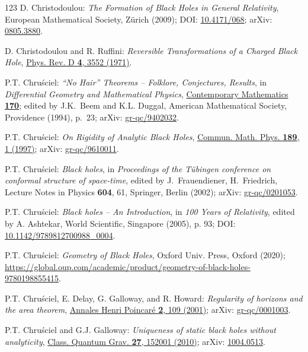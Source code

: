 \begin{thebibliography}{123}
D. Christodoulou:
{\em The Formation of Black Holes in General Relativity},
European Mathematical Society, Zürich (2009);
DOI: \href{https://doi.org/10.4171/068}{10.4171/068};
arXiv: \href{https://arxiv.org/abs/0805.3880}{0805.3880}.

D. Christodoulou and R. Ruffini:
{\em Reversible Transformations of a Charged Black Hole},
\href{https://doi.org/10.1103/PhysRevD.4.3552}{Phys. Rev. D {\bf 4}, 3552 (1971)}.

P.T. Chru\'sciel:
{\em ``No Hair'' Theorems -- Folklore, Conjectures, Results},
in {\em Differential Geometry and Mathematical Physics},
\href{https://doi.org/10.1090/conm/170}{Contemporary Mathematics {\bf 170}};
edited by  J.K.~Beem and K.L. Duggal,
American Mathematical Society, Providence (1994), p.~23;
arXiv: \href{https://arxiv.org/abs/gr-qc/9402032}{gr-qc/9402032}.

P.T. Chru\'sciel: {\em On Rigidity of Analytic Black Holes},
\href{https://doi.org/10.1007/s002200050187}{Commun. Math. Phys. {\bf 189}, 1 (1997)};
arXiv: \href{https://arxiv.org/abs/gr-qc/9610011}{gr-qc/9610011}.

P.T. Chru\'sciel: {\em Black holes},
in {\em Proceedings of the T\"ubingen conference on conformal structure of
space-time}, edited by J.~Frauendiener, H.~Friedrich,
Lecture Notes in Physics {\bf 604}, 61,
Springer, Berlin (2002);
arXiv: \href{https://arxiv.org/abs/gr-qc/0201053}{gr-qc/0201053}.

P.T. Chru\'sciel: {\em Black holes -- An Introduction},
in {\em 100 Years of Relativity}, edited by A. Ashtekar,
World Scientific, Singapore (2005), p. 93;
DOI: \href{https://doi.org/10.1142/9789812700988_0004}{10.1142/9789812700988\_0004}.

P.T. Chru\'sciel: {\em Geometry of Black Holes},
Oxford Univ. Press, Oxford (2020);
{\footnotesize \url{https://global.oup.com/academic/product/geometry-of-black-holes-9780198855415}}.

P.T. Chru\'sciel, E. Delay, G. Galloway, and R. Howard:
{\em Regularity of horizons and the area theorem},
\href{https://doi.org/10.1007/PL00001029}{Annales Henri Poincaré {\bf 2}, 109 (2001)};
arXiv: \href{https://arxiv.org/abs/gr-qc/0001003}{gr-qc/0001003}.

P.T. Chru\'sciel and G.J. Galloway:
{\em Uniqueness of static black holes without analyticity},
\href{https://doi.org/10.1088/0264-9381/27/15/152001}{Class. Quantum Grav. {\bf 27}, 152001 (2010)};
arXiv: \href{https://arxiv.org/abs/1004.0513}{1004.0513}.


\end{thebibliography}
